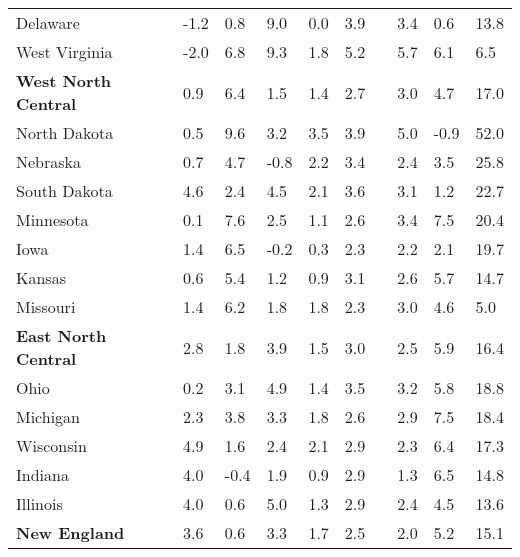 {\begin{tabular}{p{30mm} R{7mm} R{7mm} R{7mm} R{7mm} 
             R{7mm} p{0mm} R{9mm} R{9mm} R{10mm} }
\hspace{3mm}  Delaware  & -1.2 & 0.8 & 9.0 & 0.0 & 3.9 &  & 3.4 & 0.6 & 13.8 \\
\hspace{3mm}  West Virginia  & -2.0 & 6.8 & 9.3 & 1.8 & 5.2 &  & 5.7 & 6.1 & 6.5 \\
\hspace{1mm} \textbf{West North Central}  & 0.9 & 6.4 & 1.5 & 1.4 & 2.7 &  & 3.0 & 4.7 & 17.0 \\
\hspace{3mm}  North Dakota  & 0.5 & 9.6 & 3.2 & 3.5 & 3.9 &  & 5.0 & -0.9 & 52.0 \\
\hspace{3mm}  Nebraska  & 0.7 & 4.7 & -0.8 & 2.2 & 3.4 &  & 2.4 & 3.5 & 25.8 \\
\hspace{3mm}  South Dakota  & 4.6 & 2.4 & 4.5 & 2.1 & 3.6 &  & 3.1 & 1.2 & 22.7 \\
\hspace{3mm}  Minnesota  & 0.1 & 7.6 & 2.5 & 1.1 & 2.6 &  & 3.4 & 7.5 & 20.4 \\
\hspace{3mm}  Iowa  & 1.4 & 6.5 & -0.2 & 0.3 & 2.3 &  & 2.2 & 2.1 & 19.7 \\
\hspace{3mm}  Kansas  & 0.6 & 5.4 & 1.2 & 0.9 & 3.1 &  & 2.6 & 5.7 & 14.7 \\
\hspace{3mm}  Missouri  & 1.4 & 6.2 & 1.8 & 1.8 & 2.3 &  & 3.0 & 4.6 & 5.0 \\
\hspace{1mm} \textbf{East North Central}  & 2.8 & 1.8 & 3.9 & 1.5 & 3.0 &  & 2.5 & 5.9 & 16.4 \\
\hspace{3mm}  Ohio  & 0.2 & 3.1 & 4.9 & 1.4 & 3.5 &  & 3.2 & 5.8 & 18.8 \\
\hspace{3mm}  Michigan  & 2.3 & 3.8 & 3.3 & 1.8 & 2.6 &  & 2.9 & 7.5 & 18.4 \\
\hspace{3mm}  Wisconsin  & 4.9 & 1.6 & 2.4 & 2.1 & 2.9 &  & 2.3 & 6.4 & 17.3 \\
\hspace{3mm}  Indiana  & 4.0 & -0.4 & 1.9 & 0.9 & 2.9 &  & 1.3 & 6.5 & 14.8 \\
\hspace{3mm}  Illinois  & 4.0 & 0.6 & 5.0 & 1.3 & 2.9 &  & 2.4 & 4.5 & 13.6 \\
\hspace{1mm} \textbf{New England}  & 3.6 & 0.6 & 3.3 & 1.7 & 2.5 &  & 2.0 & 5.2 & 15.1 \\

\end{tabular}}
